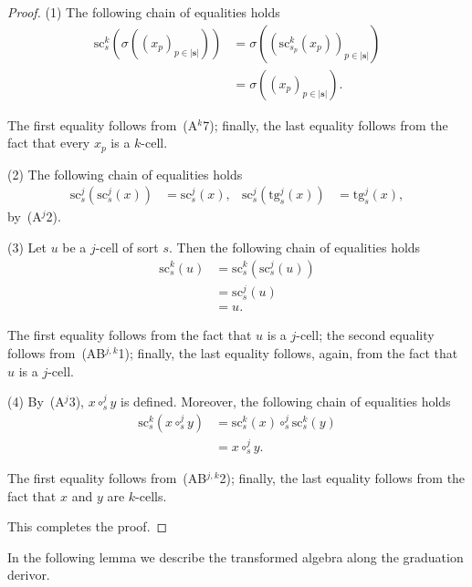 \documentclass[a4paper, reqno
]{amsart}
\newcommand{\bb}[1]{\ensuremath{\lvert #1 \rvert}}
\newcommand{\src}{\mathrm{sc}}
\newcommand{\tgt}{\mathrm{tg}}
\theoremstyle{plain}
\theoremstyle{definition}
\begin{document}
\begin{proof}
(1) The following chain of equalities holds
\begin{align*}
\src^{k}_{s}\left(\sigma\left((x_{p})_{p\in\bb{\mathbf{s}}}\right)\right)
&=
\sigma\left(\left(\src^{k}_{s_{p}}(x_{p})\right)_{p\in\bb{\mathbf{s}}}\right)
\tag{1}
\\&=
\sigma\left((x_{p})_{p\in\bb{\mathbf{s}}}\right).
\tag{2}
\end{align*}

The first equality follows from~(A$^{k}$7); finally, the last equality follows from the fact that every $x_{p}$ is a $k$-cell.

(2) The following chain of equalities holds
\begin{align*}
\src^{j}_{s}\left(\src^{j}_{s}(x)\right)
&=
\src^{j}_{s}(x),
&
\src^{j}_{s}\left(\tgt^{j}_{s}(x)\right)
&=
\tgt^{j}_{s}(x),
\end{align*}
by~(A$^{j}$2).

(3) Let $u$ be a $j$-cell of sort $s$.
Then the following chain of equalities holds
\begin{align*}
\src^{k}_{s}(u)
&=
\src^{k}_{s}\left(\src^{j}_{s}(u)\right)
\tag{1}
\\&=
\src^{j}_{s}(u)
\tag{2}
\\&=
u.
\tag{3}
\end{align*}

The first equality follows from the fact that $u$ is a $j$-cell; the second equality follows from~(AB$^{j,k}$1); finally, the last equality follows, again, from the fact that $u$ is a $j$-cell.

(4) By~(A$^{j}$3), $x\circ^{j}_{s}y$ is defined.
Moreover, the following chain of equalities holds
\begin{align*}
\src^{k}_{s}\left(x\circ^{j}_{s}y\right)
&=
\src^{k}_{s}(x)\circ^{j}_{s}\src^{k}_{s}(y)
\tag{1}
\\&=
x\circ^{j}_{s}y.
\tag{2}
\end{align*}

The first equality follows from~(AB$^{j,k}$2); finally, the last equality follows from the fact that $x$ and $y$ are $k$-cells.

This completes the proof.
\end{proof}

In the following lemma we describe the transformed algebra along the graduation derivor.
\end{document}
